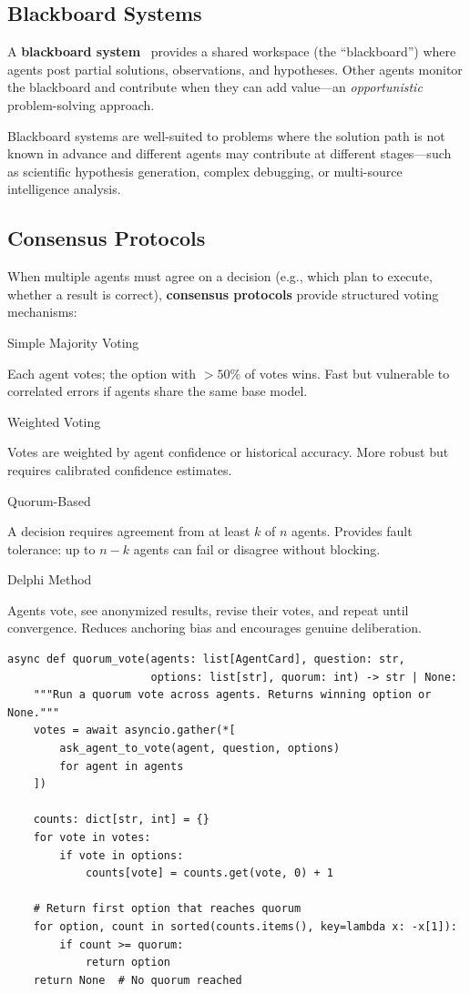 \subsection{Blackboard Systems}
\label{blackboard-systems}

A \textbf{blackboard system}~\cite{hayes1985blackboard} provides a shared workspace (the ``blackboard'') where agents post partial solutions, observations, and hypotheses. Other agents monitor the blackboard and contribute when they can add value---an \emph{opportunistic} problem-solving approach.

Blackboard systems are well-suited to problems where the solution path is not known in advance and different agents may contribute at different stages---such as scientific hypothesis generation, complex debugging, or multi-source intelligence analysis.

\subsection{Consensus Protocols}
\label{consensus-protocols}

When multiple agents must agree on a decision (e.g., which plan to execute, whether a result is correct), \textbf{consensus protocols} provide structured voting mechanisms:

Simple Majority Voting

Each agent votes; the option with $> 50\%$ of votes wins. Fast but vulnerable to correlated errors if agents share the same base model.

Weighted Voting

Votes are weighted by agent confidence or historical accuracy. More robust but requires calibrated confidence estimates.

Quorum-Based

A decision requires agreement from at least $k$ of $n$ agents. Provides fault tolerance: up to $n-k$ agents can fail or disagree without blocking.

Delphi Method

Agents vote, see anonymized results, revise their votes, and repeat until convergence. Reduces anchoring bias and encourages genuine deliberation.

\begin{lstlisting}[style=pythonstyle]
async def quorum_vote(agents: list[AgentCard], question: str,
                      options: list[str], quorum: int) -> str | None:
    """Run a quorum vote across agents. Returns winning option or None."""
    votes = await asyncio.gather(*[
        ask_agent_to_vote(agent, question, options)
        for agent in agents
    ])

    counts: dict[str, int] = {}
    for vote in votes:
        if vote in options:
            counts[vote] = counts.get(vote, 0) + 1

    # Return first option that reaches quorum
    for option, count in sorted(counts.items(), key=lambda x: -x[1]):
        if count >= quorum:
            return option
    return None  # No quorum reached
\end{lstlisting}

